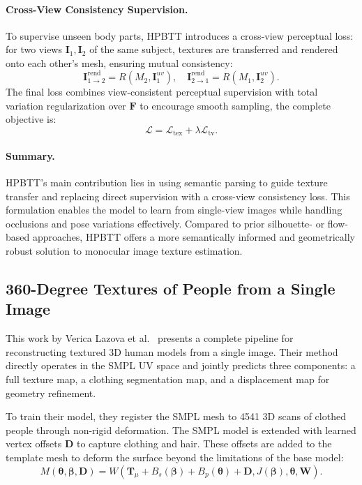 \paragraph{Cross-View Consistency Supervision.}
To supervise unseen body parts, HPBTT introduces a cross-view perceptual loss: for two views $\mathbf{I}_1, \mathbf{I}_2$ of the same subject, textures are transferred and rendered onto each other's mesh, ensuring mutual consistency:
\begin{equation}
\mathbf{I}^{\text{rend}}_{1 \rightarrow 2} = R(M_2, \mathbf{I}^{uv}_1), \quad \mathbf{I}^{\text{rend}}_{2 \rightarrow 1} = R(M_1, \mathbf{I}^{uv}_2).
\end{equation}
The final loss combines view-consistent perceptual supervision with total variation regularization over $\mathbf{F}$ to encourage smooth sampling, the complete objective is:
\begin{equation}
\mathcal{L} = \mathcal{L}_{\text{tex}} + \lambda \mathcal{L}_{\text{tv}}.
\end{equation}

\paragraph{Summary.}
HPBTT’s main contribution lies in using semantic parsing to guide texture transfer and replacing direct supervision with a cross-view consistency loss. This formulation enables the model to learn from single-view images while handling occlusions and pose variations effectively. Compared to prior silhouette- or flow-based approaches, HPBTT offers a more semantically informed and geometrically robust solution to monocular image texture estimation.


\subsection{360-Degree Textures of People from a Single Image}

This work by Verica Lazova et al.~\cite{lazova2019360} presents a complete pipeline for reconstructing textured 3D human models from a single image. Their method directly operates in the SMPL UV space and jointly predicts three components: a full texture map, a clothing segmentation map, and a displacement map for geometry refinement. 

To train their model, they register the SMPL mesh to 4541 3D scans of clothed people through non-rigid deformation. The SMPL model is extended with learned vertex offsets $\mathbf{D}$ to capture clothing and hair. These offsets are added to the template mesh to deform the surface beyond the limitations of the base model:
\begin{equation}
M(\boldsymbol{\theta}, \boldsymbol{\beta}, \mathbf{D}) = W(\mathbf{T}_\mu + B_s(\boldsymbol{\beta}) + B_p(\boldsymbol{\theta}) + \mathbf{D}, J(\boldsymbol{\beta}), \boldsymbol{\theta}, \mathbf{W}).
\end{equation}

